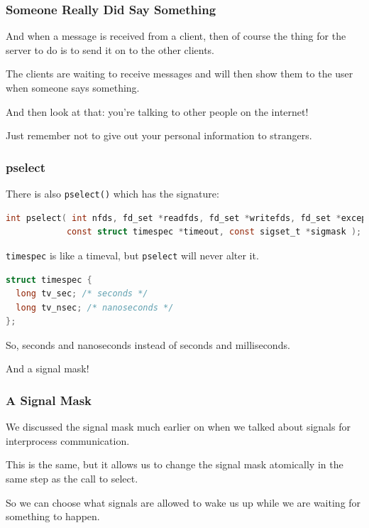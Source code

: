 \begin{frame}
	\frametitle{Someone Really Did Say Something}

	And when a message is received from a client, then of course the thing for the server to do is to send it on to the other clients.

	The clients are waiting to receive messages and will then show them to the user when someone says something.

	And then look at that: you're talking to other people on the internet!

	Just remember not to give out your personal information to strangers.

\end{frame}

\begin{frame}[fragile]
	\frametitle{pselect}

	There is also \texttt{pselect()} which has the signature:
	\begin{lstlisting}[language=C]
int pselect( int nfds, fd_set *readfds, fd_set *writefds, fd_set *exceptfds, 
            const struct timespec *timeout, const sigset_t *sigmask );
\end{lstlisting}

	\texttt{timespec} is like a timeval, but \texttt{pselect} will never alter it.

	\begin{lstlisting}[language=C]
struct timespec {
  long tv_sec; /* seconds */
  long tv_nsec; /* nanoseconds */
};
\end{lstlisting}

	So, seconds and nanoseconds instead of seconds and milliseconds.

	And a signal mask!

\end{frame}


\begin{frame}
	\frametitle{A Signal Mask}

	We discussed the signal mask much earlier on when we talked about signals for interprocess communication.

	This is the same, but it allows us to change the signal mask atomically in the same step as the call to select.

	So we can choose what signals are allowed to wake us up while we are waiting for something to happen.


\end{frame}

